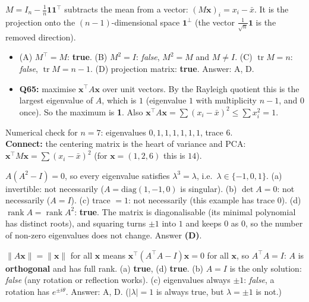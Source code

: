 \documentclass[11pt,a4paper]{article}
\newcommand{\rank}{\operatorname{rank}}
\newcommand{\tr}{\operatorname{tr}}
\begin{document}
\begin{example}
$M=I_n-\frac1n\mathbf1\mathbf1^\top$ subtracts the mean from a vector: $(M\mathbf x)_i=x_i-\bar x$. It is the projection onto the $(n-1)$-dimensional space $\mathbf1^\perp$ (the vector $\frac1{\sqrt n}\mathbf1$ is the removed direction).
\begin{itemize}[noitemsep]
\item (A) $M^\top=M$: \textbf{true}. (B) $M^2=I$: \emph{false}, $M^2=M$ and $M\ne I$. (C) $\tr M=n$: \emph{false}, $\tr M=n-1$. (D) projection matrix: \textbf{true}. Answer: A, D.
\item \textbf{Q65:} maximise $\mathbf x^\top A\mathbf x$ over unit vectors. By the Rayleigh quotient this is the largest eigenvalue of $A$, which is $1$ (eigenvalue $1$ with multiplicity $n-1$, and $0$ once). So the maximum is \textbf{1}. Also $\mathbf x^\top A\mathbf x=\sum(x_i-\bar x)^2\le\sum x_i^2=1$.
\end{itemize}
Numerical check for $n=7$: eigenvalues $0,1,1,1,1,1,1$, trace $6$.\\
\textbf{Connect:} the centering matrix is the heart of variance and PCA: $\mathbf x^\top M\mathbf x=\sum(x_i-\bar x)^2$ (for $\mathbf x=(1,2,6)$ this is $14$).
\end{example}

\begin{example}[2025 Q37 (2 marks, MCQ): $A^3=A$]
$A(A^2-I)=0$, so every eigenvalue satisfies $\lambda^3=\lambda$, i.e.\ $\lambda\in\{-1,0,1\}$. (a) invertible: not necessarily ($A=\mathrm{diag}(1,-1,0)$ is singular). (b) $\det A=0$: not necessarily ($A=I$). (c) trace $=1$: not necessarily (this example has trace $0$). (d) $\rank A=\rank A^2$: \textbf{true}. The matrix is diagonalisable (its minimal polynomial has distinct roots), and squaring turns $\pm1$ into $1$ and keeps $0$ as $0$, so the number of non-zero eigenvalues does not change. Answer \textbf{(D)}.
\end{example}

\begin{example}
$\|A\mathbf x\|=\|\mathbf x\|$ for all $\mathbf x$ means $\mathbf x^\top(A^\top A-I)\mathbf x=0$ for all $\mathbf x$, so $A^\top A=I$: $A$ is \textbf{orthogonal} and has full rank. (a) \textbf{true}, (d) \textbf{true}. (b) $A=I$ is the only solution: \emph{false} (any rotation or reflection works). (c) eigenvalues always $\pm1$: \emph{false}, a rotation has $e^{\pm i\theta}$. Answer: A, D. ($|\lambda|=1$ is always true, but $\lambda=\pm1$ is not.)
\end{example}
\end{document}
